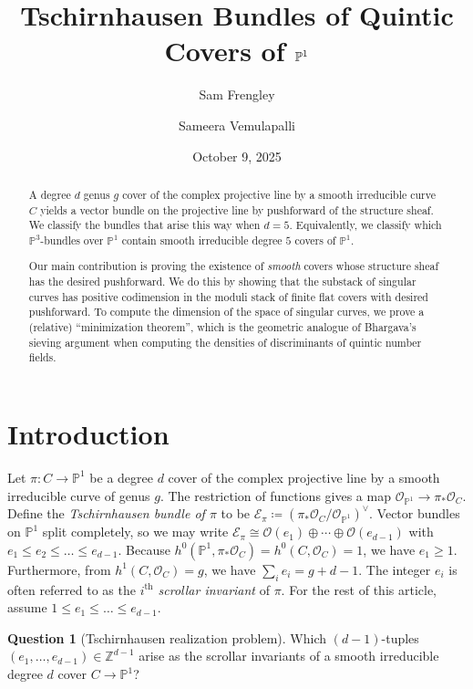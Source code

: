 \documentclass[11pt]{amsart}
\title[Tschirnhausen Bundles of Quintic Covers of $\PP^1$]{Tschirnhausen Bundles of Quintic Covers of $\PP^1$}
\date{October 9, 2025}
\author{Sam Frengley}
\author{Sameera Vemulapalli}
\numberwithin{theorem}{section}
\numberwithin{equation}{section}
\theoremstyle{definition}\newtheorem{defn}[theorem]{Definition}
\theoremstyle{definition}\newtheorem{remark}[theorem]{Remark}
\theoremstyle{definition}\newtheorem{question}[theorem]{Question}
\theoremstyle{definition}\newtheorem{problem}[theorem]{Problem}
\newcommand{\ZZ}{\mathbb{Z}}
\newcommand{\PP}{\mathbb{P}}
\newcommand{\cE}{\mathcal{E}}
\newcommand{\cO}{\mathcal{O}}
\begin{document}
\begin{abstract}
  A degree $d$ genus $g$ cover of the complex projective line by a smooth irreducible curve $C$ yields a vector bundle on the projective line by pushforward of the structure sheaf. We classify the bundles that arise this way when $d = 5$. Equivalently, we classify which $\PP^3$-bundles over $\PP^1$ contain smooth irreducible degree $5$ covers of $\PP^1$.

  Our main contribution is proving the existence of \emph{smooth} covers whose structure sheaf has the desired pushforward. We do this by showing that the substack of singular curves has positive codimension in the moduli stack of finite flat covers with desired pushforward. To compute the dimension of the space of singular curves, we prove a (relative) ``minimization theorem'', which is the geometric analogue of Bhargava's sieving argument when computing the densities of discriminants of quintic number fields.
\end{abstract}


\maketitle

\setcounter{tocdepth}{1}
\tableofcontents


\section{Introduction}
Let $\pi \colon C \rightarrow \PP^1$ be a degree $d$ cover of the complex projective line by a smooth irreducible curve of genus $g$. The restriction of functions gives a map $\cO_{\PP^1} \rightarrow \pi_* \cO_C$.  Define the \emph{Tschirnhausen bundle of $\pi$} to be $\mathcal{E}_{\pi} \coloneqq (\pi_* \cO_C /\cO_{\PP^1})^{\vee}$. Vector bundles on $\PP^1$ split completely, so we may write $\cE_\pi \cong \cO(e_1)\oplus \cdots \oplus \cO(e_{d-1})$ with $e_1 \leq e_2 \leq \dots \leq e_{d-1}$. Because $h^0(\PP^1, \pi_* \cO_C) = h^0(C,\cO_C) = 1$, we have $e_1 \geq 1$. Furthermore, from $h^1(C,\cO_C) = g$, we have $\sum_i e_i = g + d - 1$. The integer $e_i$ is often referred to as the \emph{$i^{\text{th}}$ scrollar invariant} of $\pi$. For the rest of this article, assume $1 \leq e_1 \leq \dots \leq e_{d-1}$.

\begin{question}[Tschirnhausen realization problem]
\label{q:main}
    Which $(d-1)$-tuples $(e_1,\dots,e_{d-1}) \in \ZZ^{d-1}$ arise as the scrollar invariants of a smooth irreducible degree $d$ cover $C \rightarrow \PP^1$?
\end{question}
\end{document}
